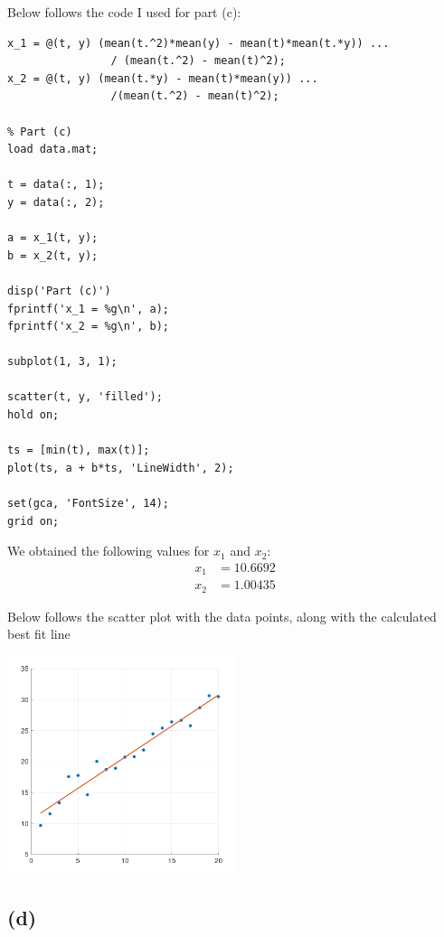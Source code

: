\documentclass{article}
\begin{document}
Below follows the code I used for part (c):
\begin{Verbatim}[frame = single,
	label = \textsc{Matlab} code for part (c)]
% We define the functions that yield x_1 and x_2 from y and t
x_1 = @(t, y) (mean(t.^2)*mean(y) - mean(t)*mean(t.*y)) ...
				/ (mean(t.^2) - mean(t)^2);
x_2 = @(t, y) (mean(t.*y) - mean(t)*mean(y)) ...
				/(mean(t.^2) - mean(t)^2);

% Part (c)
load data.mat;

t = data(:, 1);
y = data(:, 2);

a = x_1(t, y);
b = x_2(t, y);

disp('Part (c)')
fprintf('x_1 = %g\n', a);
fprintf('x_2 = %g\n', b);

subplot(1, 3, 1);

scatter(t, y, 'filled');
hold on;

ts = [min(t), max(t)];
plot(ts, a + b*ts, 'LineWidth', 2);

set(gca, 'FontSize', 14);
grid on;
\end{Verbatim}

We obtained the following values for $x_1$ and $x_2$:
\begin{align*}
	x_1 &= 10.6692\\
	x_2 &= 1.00435
\end{align*}

Below follows the scatter plot with the data points, along
with the calculated best fit line

\begin{center}
	\includegraphics[width=0.5\textwidth]{figure1.png}
\end{center}

\subsection*{(d)}
\end{document}
